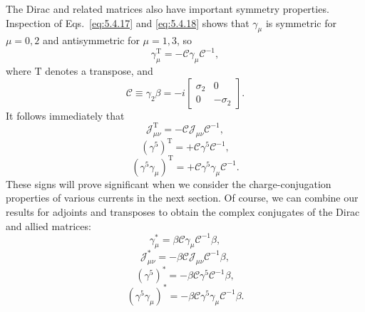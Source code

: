 The Dirac and related matrices also have important symmetry properties.
Inspection of Eqs.~\eqref{eq:5.4.17} and \eqref{eq:5.4.18} shows that $\gamma_\mu$ is symmetric
for $\mu=0,2$ and antisymmetric for $\mu=1,3$, so
\begin{equation}
\gamma_\mu^{\mathrm T}=-\mathcal{C}\gamma_\mu\mathcal{C}^{-1},
\tag{5.4.35}\label{eq:5.4.35}
\end{equation}
where $\mathrm T$ denotes a transpose, and
\begin{equation}
\mathcal{C}\equiv\gamma_2\beta=-i
\begin{bmatrix}\sigma_2&0\\0&-\sigma_2\end{bmatrix}.
\tag{5.4.36}\label{eq:5.4.36}
\end{equation}
It follows immediately that
\begin{equation}
\mathcal{J}_{\mu\nu}^{\mathrm T}=-\mathcal{C}\mathcal{J}_{\mu\nu}\mathcal{C}^{-1},
\tag{5.4.37}\label{eq:5.4.37}
\end{equation}
\begin{equation}
(\gamma^5)^{\mathrm T}=+\mathcal{C}\gamma^5\mathcal{C}^{-1},
\tag{5.4.38}\label{eq:5.4.38}
\end{equation}
\begin{equation}
(\gamma^5\gamma_\mu)^{\mathrm T}
=+\mathcal{C}\gamma^5\gamma_\mu\mathcal{C}^{-1}.
\tag{5.4.39}\label{eq:5.4.39}
\end{equation}
These signs will prove significant when we consider the charge-conjugation
properties of various currents in the next section. Of course, we can combine
our results for adjoints and transposes to obtain the complex conjugates of the
Dirac and allied matrices:
\begin{equation}
\gamma_\mu^*=\beta\mathcal{C}\gamma_\mu\mathcal{C}^{-1}\beta,
\tag{5.4.40}\label{eq:5.4.40}
\end{equation}
\begin{equation}
\mathcal{J}_{\mu\nu}^*=-\beta\mathcal{C}\mathcal{J}_{\mu\nu}\mathcal{C}^{-1}\beta,
\tag{5.4.41}\label{eq:5.4.41}
\end{equation}
\begin{equation}
(\gamma^5)^*=-\beta\mathcal{C}\gamma^5\mathcal{C}^{-1}\beta,
\tag{5.4.42}\label{eq:5.4.42}
\end{equation}
\begin{equation}
(\gamma^5\gamma_\mu)^*=-\beta\mathcal{C}\gamma^5\gamma_\mu\mathcal{C}^{-1}\beta.
\tag{5.4.43}\label{eq:5.4.43}
\end{equation}
